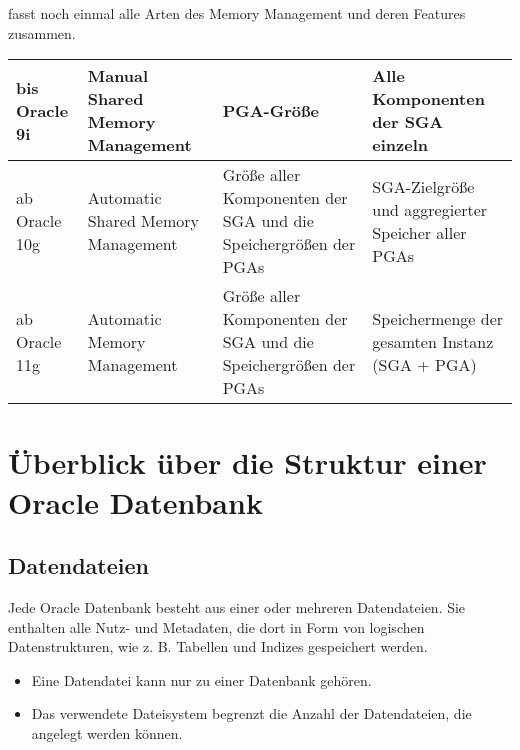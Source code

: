          fasst noch einmal alle Arten des Memory Management und deren Features zusammen.

        \begin{center}
          \label{tabmemorymanagement}
          \begin{small}
            \tabletail{
              \hline
            }
            \tablelasttail{
              \hline
            }
            \begin{supertabular}{|p{2.1cm}|p{4.15cm}|p{4.5cm}|p{3.6cm}|}
              bis Oracle 9i & \raggedright Manual Shared Memory Management & PGA-Gr\"o\ss{}e & Alle Komponenten der SGA einzeln \\
              \hline
              ab Oracle 10g & \raggedright Automatic Shared Memory Management & Gr\"o\ss{}e aller Komponenten der SGA und die Speichergr\"o\ss{}en der PGAs & SGA-Zielgr\"o\ss{}e und ag\-gre\-gier\-ter Speicher aller PGAs\\
              \hline
              ab Oracle 11g & \raggedright Automatic Memory Management & Gr\"o\ss{}e aller Komponenten der SGA und die Speichergr\"o\ss{}en der PGAs & Speichermenge der gesamten Instanz (SGA + PGA)\\
            \end{supertabular}
          \end{small}
        \end{center}

      \section{\"Uberblick \"uber die Struktur einer Oracle Datenbank}
        \subsection{Datendateien}
          Jede Oracle Datenbank besteht aus einer oder mehreren Datendateien. Sie enthalten alle Nutz- und Metadaten, die dort in Form von logischen Datenstrukturen, wie z. B. Tabellen und Indizes gespeichert werden.
          \begin{merke}
            \begin{itemize}
              \item Eine Datendatei kann nur zu einer Datenbank geh\"oren.
              \item Das verwendete Dateisystem begrenzt die Anzahl der Datendateien, die angelegt werden k\"onnen.
            \end{itemize}
          \end{merke}
